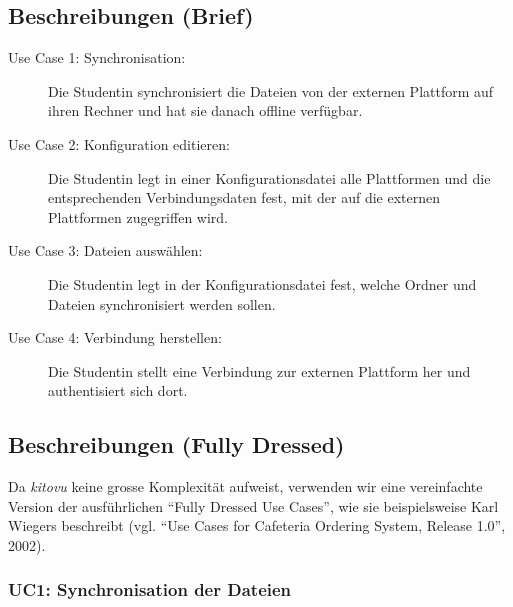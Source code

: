 \documentclass[a4paper]{article}
\begin{document}
\subsection{Beschreibungen (Brief)}
\begin{description}
	
\item[Use Case 1: Synchronisation:] Die Studentin synchronisiert die Dateien von der externen Plattform auf ihren Rechner und hat sie danach offline verfügbar.
	
\item[Use Case 2: Konfiguration editieren:] Die Studentin legt in einer Konfigurationsdatei alle Plattformen und die entsprechenden Verbindungsdaten fest, mit der auf die externen Plattformen zugegriffen wird.

\item[Use Case 3: Dateien auswählen:] Die Studentin legt in der Konfigurationsdatei fest, welche Ordner und Dateien synchronisiert werden sollen.

\item[Use Case 4: Verbindung herstellen:] Die Studentin stellt eine Verbindung zur externen Plattform her und authentisiert sich dort.


\end{description}

\pagebreak
\subsection{Beschreibungen (Fully Dressed)}

Da \emph{kitovu} keine grosse Komplexität aufweist, verwenden wir eine vereinfachte Version der ausführ\-lichen ``Fully Dressed Use Cases'', wie sie beispielsweise Karl Wiegers beschreibt (vgl. ``Use Cases for Cafeteria Ordering System, Release 1.0'', 2002).


\subsubsection{UC1: Synchronisation der Dateien}
\end{document}

